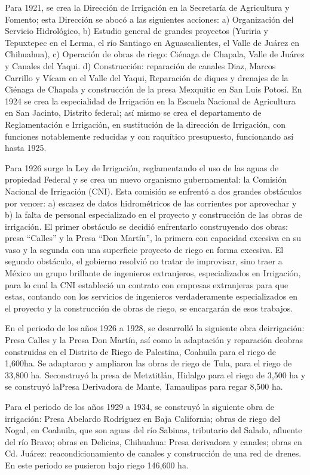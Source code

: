 Para 1921, se crea la Dirección de Irrigación en la Secretaría de Agricultura y Fomento; esta Dirección se abocó a las siguientes acciones: a) Organización del Servicio Hidrológico, b) Estudio general de grandes proyectos (Yuriria y Tepuxtepec en el Lerma, el río Santiago en Aguascalientes, el Valle de Juárez en Chihuahua), c) Operación de obras de riego: Ciénaga de Chapala, Valle de Juárez y Canales del Yaqui. d) Construcción: reparación de canales Diaz, Marcos Carrillo y Vícam en el Valle del Yaqui, Reparación de diques y drenajes de la Ciénaga de Chapala y construcción de la presa Mexquitic en San Luis Potosí. En 1924 se crea la especialidad de Irrigación en la Escuela Nacional de Agricultura en San Jacinto, Distrito federal; así mismo se crea el departamento de Reglamentación e Irrigación, en sustitución de la dirección de Irrigación, con funciones notablemente reducidas y con raquítico presupuesto, funcionando así hasta 1925.

Para 1926 surge la Ley de Irrigación, reglamentando el uso de las aguas de propiedad Federal y se crea un nuevo organismo gubernamental: la Comisión Nacional de Irrigación (CNI). Esta comisión se enfrentó a dos grandes obstáculos por vencer: a) escasez de datos hidrométricos de las corrientes por aprovechar y b) la falta de personal especializado en el proyecto y construcción de las obras de irrigación. El primer obstáculo se decidió enfrentarlo construyendo dos obras: presa “Calles” y la Presa “Don Martín”, la primera con capacidad excesiva en su vaso y la segunda con una superficie proyecto de riego en forma excesiva. El segundo obstáculo, el gobierno resolvió no tratar de improvisar, sino traer a México un grupo brillante de ingenieros extranjeros, especializados en Irrigación, para lo cual la CNI estableció un contrato con empresas extranjeras para que estas, contando con los servicios de ingenieros verdaderamente especializados en el proyecto y la construcción de obras de riego, se encargarán de esos trabajos.

En el periodo de los años 1926 a 1928, se desarrolló la siguiente obra deirrigación: Presa Calles y la Presa Don Martín, así como la adaptación y reparación deobras construidas en el Distrito de Riego de Palestina, Coahuila para el riego de 1,600ha. Se adaptaron y ampliaron las obras de riego de Tula, para el riego de 33,800 ha. Seconstruyó la presa de Metztitlán, Hidalgo para el riego de 3,500 ha y se construyó laPresa Derivadora de Mante, Tamaulipas para regar 8,500 ha.
 
Para el periodo de los años 1929 a 1934, se construyó la siguiente obra de irrigación: Presa Abelardo Rodríguez en Baja California; obras de riego del Nogal, en Coahuila, que son aguas del río Sabinas, tributario del Salado, afluente del río Bravo; obras en Delicias, Chihuahua: Presa derivadora y canales; obras en Cd. Juárez: reacondicionamiento de canales y construcción de una red de drenes. En este periodo se pusieron bajo riego 146,600 ha.

